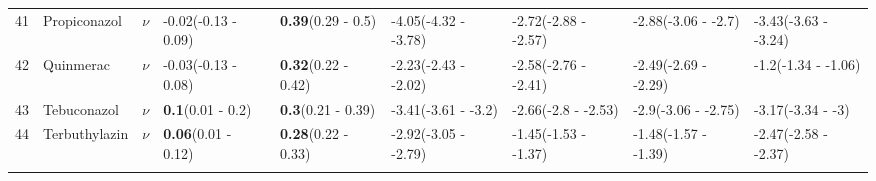 \begin{longtable}{lp{2cm}p{0.6cm}p{1.8cm}p{1.8cm}p{1.8cm}p{1.8cm}p{1.8cm}p{1.8cm}}
  41 & Propiconazol & $\nu$ & -0.02\newline (-0.13 - 0.09) & \textbf{0.39}\newline (0.29 - 0.5) & -4.05\newline (-4.32 - -3.78) & -2.72\newline (-2.88 - -2.57) & -2.88\newline (-3.06 - -2.7) & -3.43\newline (-3.63 - -3.24) \\ 
  42 & Quinmerac & $\nu$ & -0.03\newline (-0.13 - 0.08) & \textbf{0.32}\newline (0.22 - 0.42) & -2.23\newline (-2.43 - -2.02) & -2.58\newline (-2.76 - -2.41) & -2.49\newline (-2.69 - -2.29) & -1.2\newline (-1.34 - -1.06) \\ 
  43 & Tebuconazol & $\nu$ & \textbf{0.1}\newline (0.01 - 0.2) & \textbf{0.3}\newline (0.21 - 0.39) & -3.41\newline (-3.61 - -3.2) & -2.66\newline (-2.8 - -2.53) & -2.9\newline (-3.06 - -2.75) & -3.17\newline (-3.34 - -3) \\ 
  44 & Terbuthylazin & $\nu$ & \textbf{0.06}\newline (0.01 - 0.12) & \textbf{0.28}\newline (0.22 - 0.33) & -2.92\newline (-3.05 - -2.79) & -1.45\newline (-1.53 - -1.37) & -1.48\newline (-1.57 - -1.39) & -2.47\newline (-2.58 - -2.37) \\ 
   \bottomrule
\label{tab:var_model_coef}
\end{longtable}
\endgroup
